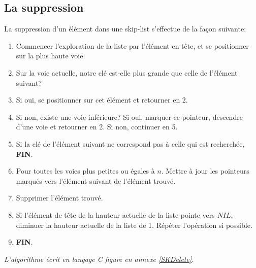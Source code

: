 \documentclass[hidelinks,a4paper, 12pt]{article}
\begin{document}
	\newpage
	\subsection{La suppression}
	La suppression d'un élément dans une skip-list s'effectue de la façon suivante:
	\begin{enumerate}
		\item Commencer l'exploration de la liste par l'élément en tête, et se positionner sur la plus haute voie.
		\item Sur la voie actuelle, notre clé est-elle plus grande que celle de l'élément suivant?
		\item Si oui, se positionner sur cet élément et retourner en 2.
		\item Si non, existe une voie inférieure? 
		\subitem Si oui, marquer ce pointeur, descendre d'une voie et retourner en 2.
		\subitem Si non, continuer en 5.
		\subitem 
		\item Si la clé de l'élément suivant ne correspond pas à celle qui est recherchée, \textbf{FIN}.
		\item Pour toutes les voies plus petites ou égales à $n$.
		\subitem  Mettre à jour les pointeurs marqués vers l'élément suivant de l'élément trouvé.	
		\item Supprimer l'élément trouvé.
		\item Si l'élément de tête de la hauteur actuelle de la liste pointe vers $NIL$, diminuer la hauteur actuelle de la liste de 1. Répéter l'opération si possible.
		\item \textbf{FIN}.
	\end{enumerate}
	\emph{L'algorithme écrit en langage C figure en annexe \ref{SKDelete}.}
	
	\newpage
\end{document}
